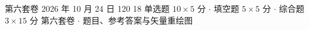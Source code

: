 \documentclass[11pt,a4paper,fontset=none]{ctexart}
\begin{document}
\raggedbottom

\makecover
  {第六套卷}
  {2026 年 10 月 24 日}
  {120}
  {18}
  {单选题 \(10\times5\) 分 \(\cdot\)
   填空题 \(5\times5\) 分 \(\cdot\)
   综合题 \(3\times15\) 分}
  {第六套卷 \(\cdot\) 题目、参考答案与矢量重绘图}



\solutiondivider

\end{document}
